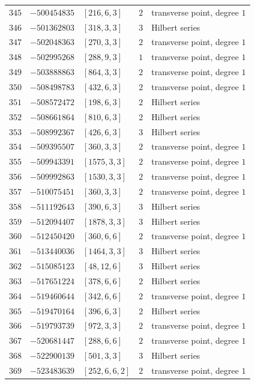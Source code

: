 \documentclass[11pt]{article}
\begin{document}
\begin{center}
\begin{longtable}{r r l c l}
$345$ & $-500454835$ & $[216,6,3]$ & $2$ & transverse point, degree $1$\\
$346$ & $-501362803$ & $[318,3,3]$ & $3$ & Hilbert series\\
$347$ & $-502048363$ & $[270,3,3]$ & $2$ & transverse point, degree $1$\\
$348$ & $-502995268$ & $[288,9,3]$ & $1$ & transverse point, degree $1$\\
$349$ & $-503888863$ & $[864,3,3]$ & $2$ & transverse point, degree $1$\\
$350$ & $-508498783$ & $[432,6,3]$ & $2$ & transverse point, degree $1$\\
$351$ & $-508572472$ & $[198,6,3]$ & $2$ & Hilbert series\\
$352$ & $-508661864$ & $[810,6,3]$ & $2$ & Hilbert series\\
$353$ & $-508992367$ & $[426,6,3]$ & $3$ & Hilbert series\\
$354$ & $-509395507$ & $[360,3,3]$ & $2$ & transverse point, degree $1$\\
$355$ & $-509943391$ & $[1575,3,3]$ & $2$ & transverse point, degree $1$\\
$356$ & $-509992863$ & $[1530,3,3]$ & $2$ & transverse point, degree $1$\\
$357$ & $-510075451$ & $[360,3,3]$ & $2$ & transverse point, degree $1$\\
$358$ & $-511192643$ & $[390,6,3]$ & $3$ & Hilbert series\\
$359$ & $-512094407$ & $[1878,3,3]$ & $3$ & Hilbert series\\
$360$ & $-512450420$ & $[360,6,6]$ & $2$ & transverse point, degree $1$\\
$361$ & $-513440036$ & $[1464,3,3]$ & $3$ & Hilbert series\\
$362$ & $-515085123$ & $[48,12,6]$ & $3$ & Hilbert series\\
$363$ & $-517651224$ & $[378,6,6]$ & $2$ & Hilbert series\\
$364$ & $-519460644$ & $[342,6,6]$ & $2$ & transverse point, degree $1$\\
$365$ & $-519470164$ & $[396,6,3]$ & $2$ & Hilbert series\\
$366$ & $-519793739$ & $[972,3,3]$ & $2$ & transverse point, degree $1$\\
$367$ & $-520681447$ & $[288,6,6]$ & $2$ & transverse point, degree $1$\\
$368$ & $-522900139$ & $[501,3,3]$ & $3$ & Hilbert series\\
$369$ & $-523483639$ & $[252,6,6,2]$ & $2$ & transverse point, degree $1$\\

\end{longtable}
\end{center}
\end{document}
